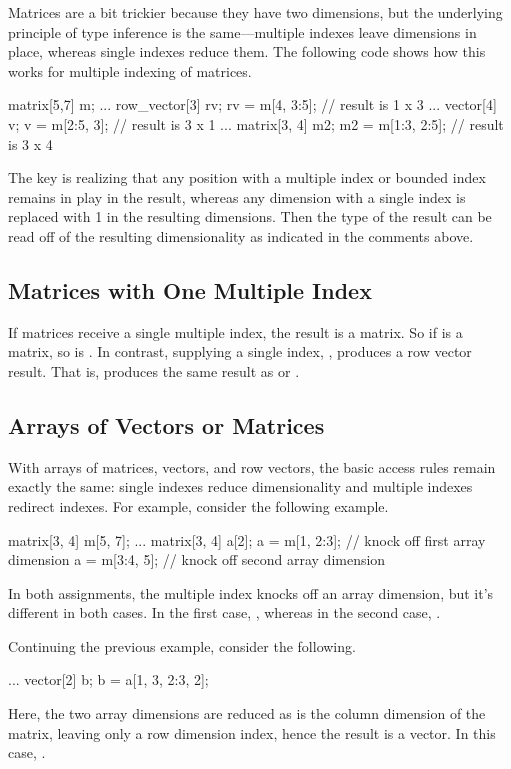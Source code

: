 Matrices are a bit trickier because they have two dimensions, but the
underlying principle of type inference is the same---multiple indexes
leave dimensions in place, whereas single indexes reduce them.  The
following code shows how this works for multiple indexing of matrices.
%
\begin{stancode}
matrix[5,7] m;
...
row_vector[3] rv;
rv = m[4, 3:5];    // result is 1 x 3
...
vector[4] v;
v = m[2:5, 3];     // result is 3 x 1
...
matrix[3, 4] m2;
m2 = m[1:3, 2:5];  // result is 3 x 4
\end{stancode}
%
The key is realizing that any position with a multiple index or
bounded index remains in play in the result, whereas any dimension
with a single index is replaced with 1 in the resulting dimensions.
Then the type of the result can be read off of the resulting
dimensionality as indicated in the comments above.

\subsection{Matrices with One Multiple Index}

If matrices receive a single multiple index, the result is a matrix.
So if  is a matrix, so is .  In contrast,
supplying a single index, , produces a row vector result.
That is,  produces the same result as  
or . 

\subsection{Arrays of Vectors or Matrices}

With arrays of matrices, vectors, and row vectors, the basic access
rules remain exactly the same: single indexes reduce dimensionality
and multiple indexes redirect indexes.  For example, consider the
following example.
%
\begin{stancode}
matrix[3, 4] m[5, 7];
...
matrix[3, 4] a[2];
a = m[1, 2:3];  // knock off first array dimension
a = m[3:4, 5];  // knock off second array dimension
\end{stancode}
%
In both assignments, the multiple index knocks off an array dimension,
but it's different in both cases.  In the first case, , whereas in the second case, .

Continuing the previous example, consider the following.
%
\begin{stancode}
...
vector[2] b;
b = a[1, 3, 2:3, 2];
\end{stancode}
%
Here, the two array dimensions are reduced as is the column dimension
of the matrix, leaving only a row dimension index, hence the result is
a vector.  In this case, .

